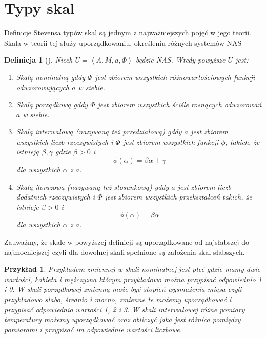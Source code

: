 \documentclass[12pt,a4paper]{report}
\newtheorem{definition}{Definicja}[chapter]
\newtheorem{przyklad}{Przykład}
\newcommand{\tuple}[1]{\left\langle {#1} \right\rangle}
\begin{document}
\section{Typy skal}
Definicje Stevensa typów skal są jednym z najważniejszych pojęć w jego teorii. Skala w teorii tej służy uporządkowaniu, określeniu różnych systemów NAS
\begin{definition}[{\citep[Def. 3]{adams1965theory}}]
Niech $U=\tuple{A, M, a, \Phi}$ będzie NAS. Wtedy powyższe $U$ jest:
\begin{enumerate}
\item
Skalą nominalną gddy $\Phi$ jest zbiorem wszystkich różnowartościowych funkcji odwzorowujących $a$ w siebie.
\item
Skalą porządkową gddy $\Phi$ jest zbiorem wszystkich ściśle rosnących odwzorowań $a$ w siebie.
\item
Skalą interwałową (nazywaną też przedziałową) gddy $a$ jest zbiorem wszystkich liczb rzeczywistych i $\Phi$ jest zbiorem wszystkich funkcji $\phi$, takich, że istnieją $\beta,\gamma$ gdzie $\beta>0$ i
\begin{equation*}
\phi(\alpha)=\beta\alpha+\gamma
\end{equation*}
dla wszystkich $\alpha$ z $a$.
\item
Skalą ilorazową (nazywaną też stosunkową) gddy $a$ jest zbiorem liczb dodatnich rzeczywistych i $\Phi$ jest zbiorem wszystkich przekształceń takich, że istnieje $\beta>0$ i
\begin{equation*}
\phi(\alpha)=\beta\alpha
\end{equation*}
dla wszystkich $\alpha$ z $a$.
\end{enumerate}
\end{definition}

Zauważmy, że skale w powyższej definicji są uporządkowane od najsłabszej do najmocniejszej czyli dla dowolnej skali spełnione są założenia skal słabszych.
\begin{przyklad}
Przykładem zmiennej w skali nominalnej jest płeć gdzie mamy dwie wartości, kobieta i mężczyzna którym przykładowo można przypisać odpowiednio 1 i 0. W skali porządkowej zmienną może być stopień wysmażenia mięsa czyli przykładowo słabo, średnio i mocno, zmienne te możemy uporządkować i przypisać odpowiednio wartości 1, 2 i 3. W skali interwałowej różne pomiary temperatury możemy uporządkować oraz obliczyć jaka jest różnica pomiędzy pomiarami i przypisać im odpowiednie wartości liczbowe.
\end{przyklad}
\end{document}
